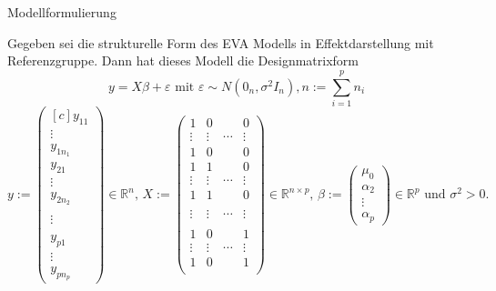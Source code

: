 \documentclass[
  8pt,
  ignorenonframetext,
]{beamer}
\begin{document}
\begin{frame}{Modellformulierung}
\protect\hypertarget{modellformulierung-4}{}
\footnotesize
\vspace{2mm}
\begin{theorem}
\justifying
\normalfont
Gegeben sei die strukturelle Form des EVA Modells in Effektdarstellung mit Referenzgruppe.
Dann hat dieses Modell die Designmatrixform
\begin{equation}
y = X\beta + \varepsilon \mbox{ mit } \varepsilon \sim N(0_n,\sigma^2 I_n), n := \sum_{i=1}^p n_i
\end{equation}
\begin{equation*}
\renewcommand{\arraystretch}{.8}
y
:=
\begin{pmatrix*}[c]
y_{11}  \\  \vdots  \\ y_{1n_1}
\\
y_{21}  \\  \vdots  \\ y_{2n_2}
\\      \\  \vdots  \\
\\
y_{p1}  \\  \vdots  \\ y_{pn_p}
\end{pmatrix*}
\in \mathbb{R}^n, \,
X :=
\begin{pmatrix}
1           &   0          &          &     0           \\
\vdots    &     \vdots &    \cdots  &   \vdots      \\
1           &   0          &            &   0             \\
1           &   1          &            &   0             \\
\vdots    &     \vdots &    \cdots  &   \vdots      \\
1           &   1        &              &   0           \\
              &                &                &                   \\
\vdots    &     \vdots &    \cdots  &   \vdots      \\
              &                &                &                   \\
1           &   0          &                &   1             \\
\vdots    &     \vdots &    \cdots  &   \vdots      \\
1           &   0        &              &   1             \\
\end{pmatrix}
\in \mathbb{R}^{n \times p},\,
\beta :=
\begin{pmatrix}
\mu_0       \\
\alpha_2    \\
\vdots      \\
\alpha_p
\end{pmatrix}
\in \mathbb{R}^{p}
\mbox{ und }
\sigma^2 > 0.
\end{equation*}
\end{theorem}
\vspace{-2mm}


\end{frame}
\end{document}
